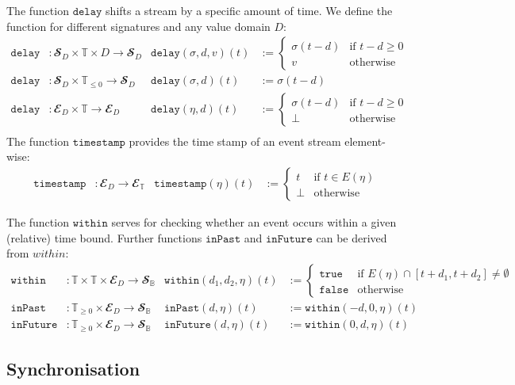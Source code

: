 The function $\mathtt{delay}$ shifts a stream by a specific amount of time.
We define the function for different signatures and any value domain $D$:
\begin{align*}
  \mathtt{delay}&: 𝓢_D × 𝕋 × D → 𝓢_D 
    & \mathtt{delay}(σ,d,v)(t) &:= \begin{cases} 
         σ(t-d) & \text{if } t-d≥0\\
         v      & \text{otherwise}
       \end{cases}\\
  \mathtt{delay}&: 𝓢_D × 𝕋_{≤0} → 𝓢_D 
    & \mathtt{delay}(σ,d)(t) &:= σ(t-d) \\
  \mathtt{delay}&: 𝓔_D × 𝕋 → 𝓔_D 
      & \mathtt{delay}(η,d)(t) &:= \begin{cases} 
           σ(t-d) & \text{if } t-d≥0\\
           ⊥      & \text{otherwise}
         \end{cases}\\
\end{align*}
The function $\mathtt{timestamp}$ provides the time stamp of an event stream element-wise:
\begin{align*}
  \mathtt{timestamp}&: 𝓔_D → 𝓔_𝕋 
    & \mathtt{timestamp}(η)(t) &:= \begin{cases}
        t & \text{if } t∈E(η)\\
        ⊥ & \text{otherwise}
      \end{cases}
\end{align*}

The function $\mathtt{within}$ serves for checking whether an event occurs within a given (relative) time bound. 
Further functions $\mathtt{inPast}$ and $\mathtt{inFuture}$ can be derived from $within$:
\begin{align*}
  \mathtt{within}&: 𝕋 × 𝕋 × 𝓔_D → 𝓢_𝔹 
    & \mathtt{within}(d_1,d_2,η)(t) &:= \begin{cases}
        \mathtt{true} & \text{if } E(η)∩[t+d_1,t+d_2]≠∅\\        
        \mathtt{false} & \text{otherwise}
      \end{cases}\\
  \mathtt{inPast}&: 𝕋_{≥0} × 𝓔_D → 𝓢_𝔹 
    & \mathtt{inPast}(d,η)(t) &:= \mathtt{within}(-d,0,η)(t)\\
  \mathtt{inFuture}&: 𝕋_{≥0} × 𝓔_D → 𝓢_𝔹 
    & \mathtt{inFuture}(d,η)(t) &:= \mathtt{within}(0,d,η)(t)
\end{align*}

\subsection{Synchronisation}

